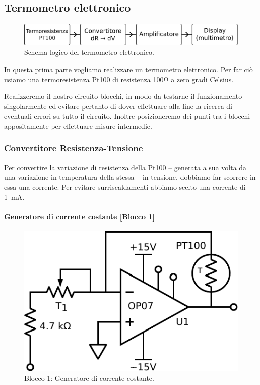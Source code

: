 \subsection{Termometro elettronico}

\begin{figure}
\centering
\includegraphics[width=.6\textwidth]{../E06/latex/s1.pdf}
\caption{Schema logico del termometro elettronico.}
\label{fig6:scheme1}
\end{figure}

In questa prima parte vogliamo realizzare un termometro elettronico.
Per far ciò usiamo una termoresistenza Pt100 di resistenza 100\si{\ohm} a zero gradi Celsius.

Realizzeremo il nostro circuito blocchi, in modo da testarne il funzionamento singolarmente ed evitare pertanto di dover effettuare alla fine la ricerca di eventuali errori su tutto il circuito.
Inoltre posizioneremo dei punti tra i blocchi appositamente per effettuare misure intermedie.

\subsubsection{Convertitore Resistenza-Tensione}
Per convertire la variazione di resistenza della Pt100 -- generata a sua volta da una variazione in temperatura della stessa -- in tensione, dobbiamo far scorrere in essa una corrente.
Per evitare surriscaldamenti abbiamo scelto una corrente di \SI{1}{\milli\ampere}.
%
\paragraph{Generatore di corrente costante [Blocco 1]\newline}

\begin{figure}
\centering
\includegraphics[width=.3\textwidth]{../E06/latex/P1.pdf}
\caption{Blocco 1: Generatore di corrente costante.}
\label{cir6:blocco1}
\end{figure}

